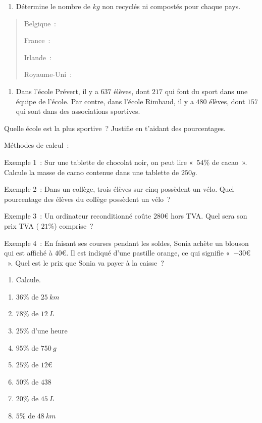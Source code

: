 \begin{enumerate}
\def\labelenumi{\alph{enumi}.}
\item
  Détermine le nombre de \(kg\) non recyclés ni compostés pour chaque
  pays.
\end{enumerate}

\begin{quote}
Belgique~:

France~:

Irlande~:

Royaume-Uni~:
\end{quote}

\begin{enumerate}
\def\labelenumi{\arabic{enumi}.}
\setcounter{enumi}{3}
\item
  Dans l'école Prévert, il y a \(637\) élèves, dont \(217\) qui font du
  sport dans une équipe de l'école. Par contre, dans l'école Rimbaud, il
  y a \(480\) élèves, dont \(157\) qui sont dans des associations
  sportives.
\end{enumerate}

Quelle école est la plus sportive~? Justifie en t'aidant des
pourcentages.

Méthodes de calcul~:

Exemple 1~: Sur une tablette de chocolat noir, on peut lire «~\(54\%\)
de cacao~». Calcule la masse de cacao contenue dans une tablette de
\(250g\).

Exemple 2~: Dans un collège, trois élèves sur cinq possèdent un vélo.
Quel pourcentage des élèves du collège possèdent un vélo~?

Exemple 3~: Un ordinateur reconditionné coûte \(280€\) hors TVA. Quel
sera son prix TVA ( \(21\%\)) comprise~?

Exemple 4~: En faisant ses courses pendant les soldes, Sonia achète un
blouson qui est affiché à \(40€\). Il est indiqué d'une pastille orange,
ce qui signifie «~\(- 30€\)~». Quel est le prix que Sonia va payer à la
caisse~?

\begin{enumerate}
\def\labelenumi{\arabic{enumi}.}
\setcounter{enumi}{4}
\item
  Calcule.
\end{enumerate}

\begin{enumerate}
\def\labelenumi{\alph{enumi}.}
\item
  \(36\%\) de \(25\ km\)
\item
  \(78\%\) de \(12\ L\)
\item
  \(25\%\) d'une heure
\item
  \(95\%\) de \(750\ g\)
\item
  \(25\%\) de \(12€\)
\item
  \(50\%\) de \(438\)
\item
  \(20\%\) de \(45\ L\)
\item
  \(5\%\) de \(48\ km\)
\end{enumerate}

